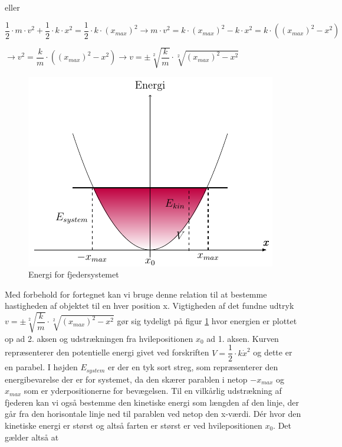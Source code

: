 eller 

\bigskip
\begin{center}
$\dfrac{1}{2} \cdot m \cdot v^2 + \dfrac{1}{2} \cdot k \cdot x^2 = \dfrac{1}{2} \cdot k \cdot (x_{max})^2 \rightarrow m \cdot v^2 = k \cdot (x_{max})^2 - k \cdot x^2 = k \cdot ((x_{max})^2 - x^2)$

$\rightarrow v^2 = \dfrac{k}{m} \cdot ((x_{max})^2 - x^2) \rightarrow v = \pm \sqrt[2]{\dfrac{k}{m}} \cdot \sqrt[2]{(x_{max})^2-x^2}$
\end{center}
\bigskip

\begin{figure}
\begin{center}
\includegraphics[scale=0.8]{Billeder/parabel}
\end{center}
\caption{Energi for fjedersystemet \label{fig:parabel}}
\end{figure} 

Med forbehold for fortegnet kan vi bruge denne relation til at bestemme hastigheden af objektet til en hver position x. Vigtigheden af det fundne udtryk $v = \pm \sqrt[2]{\dfrac{k}{m}} \cdot \sqrt[2]{(x_{max})^2-x^2}$ gør sig tydeligt på figur   \ref{fig:parabel} hvor energien er plottet op ad 2. aksen og udstrækningen fra hvilepositionen $x_0$ ad 1. aksen. Kurven repræsenterer den potentielle energi givet ved forskriften $V=\dfrac{1}{2} \cdot k \dot x^2$ og dette er en parabel. I højden $E_{system}$ er der en tyk sort streg, som repræsenterer den energibevarelse der er for systemet, da den skærer parablen i netop $-x_{max}$ og $x_{max}$ som er yderpositionerne for bevægelsen. Til en vilkårlig udstrækning af fjederen kan vi også bestemme den kinetiske energi som længden af den linje, der går fra den horisontale linje ned til parablen ved netop den x-værdi. Dér hvor den kinetiske energi er størst og altså farten er størst er ved hvilepositionen $x_0$. Det gælder altså at

